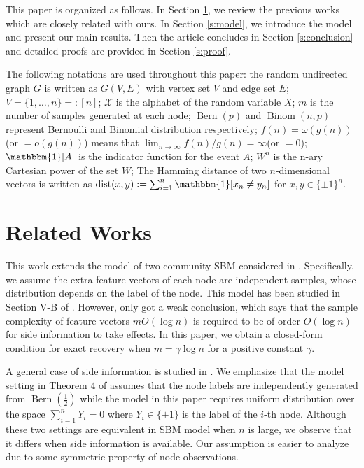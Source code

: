 \documentclass[conference]{IEEEtran}
\DeclareMathOperator{\dist}{dist}
\DeclareMathOperator{\Bern}{Bern}
\DeclareMathOperator{\Binom}{Binom}
\begin{document}
This paper is organized as follows. In Section \ref{s:rw}, we review the previous works which are closely related with ours.
In Section \ref{s:model}, we introduce the model and present our main results.
Then the article concludes in Section \ref{s:conclusion} and
detailed proofs are provided in Section \ref{s:proof}.

The following notations are used throughout this paper: 
the random undirected graph $G$ is written as $G(V,E)$ with vertex set $V$ and edge set $E$;
$V=\{1,\dots, n\} =: [n]$;
$\mathcal{X}$ is the alphabet
of the random variable $X$; $m$ is the number of samples generated at each node;
$\Bern(p)$ and $\Binom(n,p)$ represent Bernoulli
and Binomial distribution respectively; $f(n)=\omega(g(n))$(or $=o(g(n))$) means that $\lim_{n\to \infty} f(n) / g(n) = \infty $(or $=0$);
$\mathbbm{1}[A]$ is the indicator function for the event $A$; $W^n$ is the n-ary Cartesian power of the set $W$;
The Hamming distance of 
two $n$-dimensional vectors is written as $\dist(x,y):=\sum_{i=1}^n \mathbbm{1}[x_n\neq y_n]$ for $x,y\in \{\pm 1 \}^n$.

\section{Related Works}\label{s:rw}
This work extends the model of two-community SBM considered in \cite{abbe2015community}.
Specifically, we assume the extra feature vectors of each node are independent samples, whose distribution depends on the label of the node.
This model has been studied in Section V-B of \cite{saad2018community}. However,
\cite{saad2018community} only got a weak conclusion, which says that the sample complexity of feature vectors
$mO(\log n)$ is required to be of order $O(\log n)$ for side information to take effects. In this paper, we obtain
a closed-form condition for exact recovery when $m=\gamma \log n$ for a positive constant $\gamma$.

A general case of side information is studied
in \cite{abbe17sideinfo}. We emphasize that the model setting in Theorem 4 of \cite{abbe17sideinfo}
assumes that the node labels are independently generated  from $\Bern(\frac{1}{2})$ while the model
in this paper requires uniform distribution over the space $\sum_{i=1}^n Y_i = 0$ where $Y_i \in \{\pm 1 \}$ is the label of the $i$-th node.
Although these two settings are equivalent in
SBM model when $n$ is large, we observe that it differs when side information is available. Our assumption is easier to analyze due to some
symmetric property of node observations.
\end{document}
